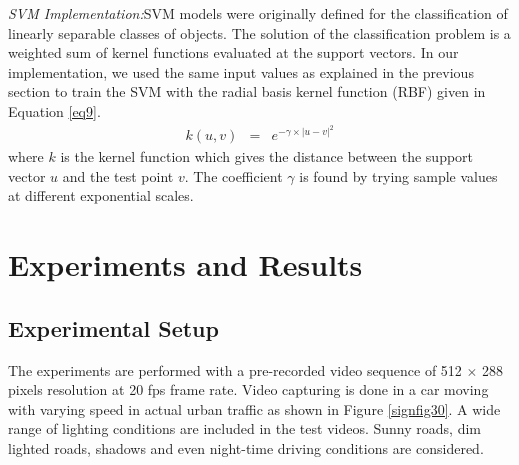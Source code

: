 \documentclass[review,number]{elsarticle}
\begin{document}
\textit{SVM Implementation:}SVM \cite{cortes1995support} models were originally defined for the classification of linearly separable classes of objects. The solution of the classification problem is a weighted sum of kernel functions evaluated at the support vectors. In our implementation, we used the same input values as explained in the previous section to train the SVM with the radial basis kernel function (RBF) given in Equation \ref{eq9}.
\begin{eqnarray}
\label{eq9}
	k(u,v) &=& e^{-\gamma \times |u-v|^2}
\end{eqnarray}
\noindent
where $k$ is the kernel function which gives the distance between the support vector $u$ and the test point $v$. The coefficient $\gamma$ is found by trying sample values at different exponential scales.

\section{Experiments and Results}
\label{sec:er}

\subsection{Experimental Setup}

The experiments are performed with a pre-recorded video sequence of 512 $\times$ 288 pixels resolution at 20 fps frame rate. Video capturing is done in a car moving with varying speed in actual urban traffic as shown in Figure \ref{signfig30}. A wide range of lighting conditions are included in the test videos. Sunny roads, dim lighted roads, shadows and even night-time driving conditions are considered.
\end{document}

